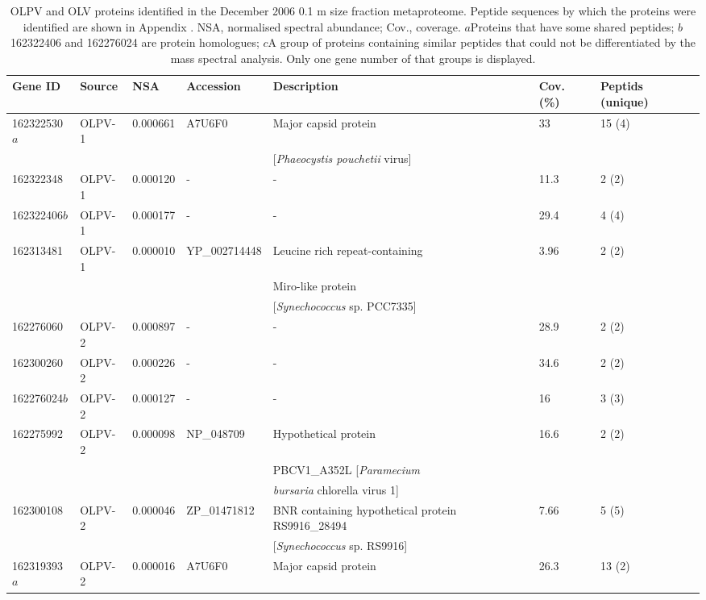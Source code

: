 \begingroup
\begin{table}
\footnotesize
\caption[OLPV and OLV proteins identified in the metaproteome]{OLPV and OLV proteins identified in the December 2006 0.1 \textmu{}m size fraction metaproteome. Peptide sequences by which the proteins were identified are shown in Appendix . NSA, normalised spectral abundance; Cov., coverage. $a$Proteins that have some shared peptides; $b$162322406 and 162276024 are protein homologues; $c$A group of proteins containing similar peptides that could not be differentiated by the mass spectral analysis. Only one gene number of that groups is displayed.}
\label{tab:pmics}
\smallskip
\begin{tabularx}{\textwidth}{p{1.3cm}p{1.2cm}p{1cm}p{2cm}p{4.7cm}p{0.6cm}p{1cm}}
\toprule
\textbf{Gene ID} & \textbf{Source} & \textbf{NSA} & \textbf{Accession} & \textbf{Description} & \textbf{Cov. (\%)} & \textbf{Peptids (unique)} \\
\midrule
162322530$a$ & OLPV-1 & 0.000661 & A7U6F0 & Major capsid protein & 33 & 15 (4) \\
 &  &  &  & [\emph{Phaeocystis pouchetii} virus] &  & \\
162322348 & OLPV-1 & 0.000120 & - & - & 11.3 & 2 (2) \\
162322406$b$ & OLPV-1 & 0.000177 & - & - & 29.4 & 4 (4) \\
162313481 & OLPV-1 & 0.000010 & YP\_002714448 & Leucine rich repeat-containing & 3.96 & 2 (2) \\
 &  &  &  & Miro-like protein & & \\
 &  &  &  & [\emph{Synechococcus} sp. PCC7335] &  & \\
162276060 & OLPV-2 & 0.000897 & - & - & 28.9 & 2 (2) \\
162300260 & OLPV-2 & 0.000226 & - & - & 34.6 & 2 (2) \\
162276024$b$ & OLPV-2 & 0.000127 & - & - & 16 & 3 (3) \\
162275992 & OLPV-2 & 0.000098 & NP\_048709 & Hypothetical protein & 16.6 & 2 (2) \\
 &  &  &  & PBCV1\_A352L [\emph{Paramecium} & &  \\
 &  &  &  & \emph{bursaria} chlorella virus 1] & &  \\
162300108 & OLPV-2 & 0.000046 & ZP\_01471812 & BNR containing hypothetical protein RS9916\_28494 & 7.66 & 5 (5) \\
 &  &  &  & [\emph{Synechococcus} sp. RS9916] &  &  \\
162319393$a$ & OLPV-2 & 0.000016 & A7U6F0 & Major capsid protein & 26.3 & 13 (2) \\

\end{tabularx}
\end{table}
